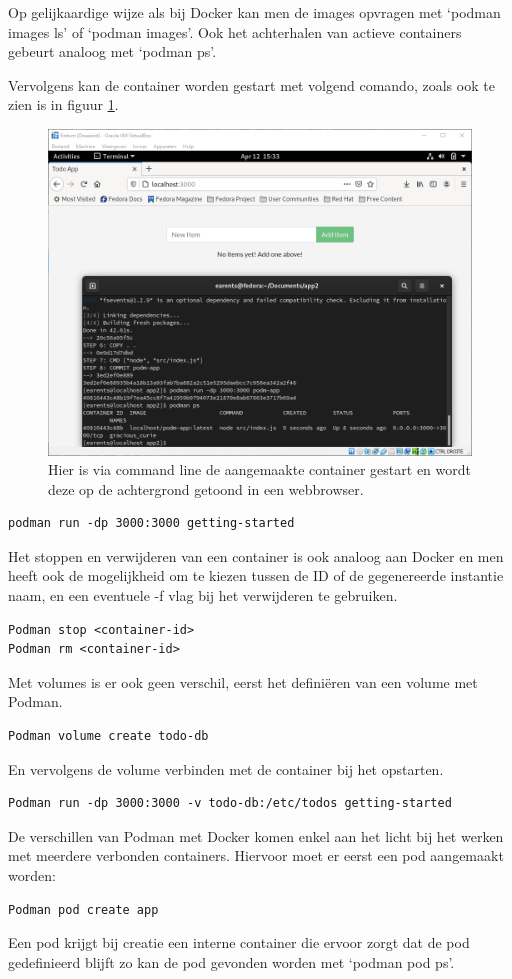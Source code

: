 Op gelijkaardige wijze als bij Docker kan men de images opvragen met `podman images ls' of `podman images'. Ook het achterhalen van actieve containers gebeurt analoog met `podman ps'.

Vervolgens kan de container worden gestart met volgend comando, zoals ook te zien is in figuur \ref{fig:podmanrun}. 
\begin{figure}[h]
    \includegraphics[width=\linewidth]{img/podmanrun.png}
    \caption[Podman die een web app uitvoert]{Hier is via command line de aangemaakte container gestart en wordt deze op de achtergrond getoond in een webbrowser.}
    \label{fig:podmanrun}
    \centering
\end{figure}
\begin{verbatim}
podman run -dp 3000:3000 getting-started
\end{verbatim}
Het stoppen en verwijderen van een container is ook analoog aan Docker en men heeft ook de mogelijkheid om te kiezen tussen de ID of de gegenereerde instantie naam, en een eventuele -f vlag bij het verwijderen te gebruiken.
\begin{verbatim}
Podman stop <container-id>
Podman rm <container-id>
\end{verbatim}
Met volumes is er ook geen verschil, eerst het definiëren van een volume met Podman.
\begin{verbatim}
Podman volume create todo-db
\end{verbatim}
En vervolgens de volume verbinden met de container bij het opstarten.
\begin{verbatim}
Podman run -dp 3000:3000 -v todo-db:/etc/todos getting-started
\end{verbatim}
De verschillen van Podman met Docker komen enkel aan het licht bij het werken met meerdere verbonden containers. Hiervoor moet er eerst een pod aangemaakt worden:
\begin{verbatim}
Podman pod create app
\end{verbatim}
Een pod krijgt bij creatie een interne container die ervoor zorgt dat de pod gedefinieerd blijft zo kan de pod gevonden worden met ‘podman pod ps’.


